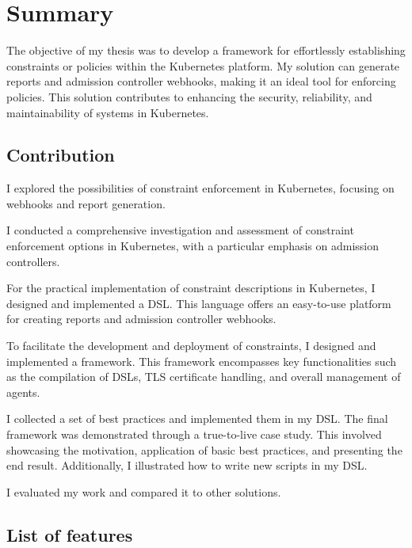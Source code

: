 \setlength{\parindent}{0pt}
\setlength{\parskip}{0.6em}

\chapter{Summary}
\label{chap:summary}

The objective of my thesis was to develop a framework for effortlessly establishing constraints or policies within the Kubernetes platform. My solution can generate reports and admission controller webhooks, making it an ideal tool for enforcing policies. This solution contributes to enhancing the security, reliability, and maintainability of systems in Kubernetes.

\section{Contribution}

I explored the possibilities of constraint enforcement in Kubernetes, focusing on webhooks and report generation.

I conducted a comprehensive investigation and assessment of constraint enforcement options in Kubernetes, with a particular emphasis on admission controllers.

For the practical implementation of constraint descriptions in Kubernetes, I designed and implemented a DSL. This language offers an easy-to-use platform for creating reports and admission controller webhooks.

To facilitate the development and deployment of constraints, I designed and implemented a framework. This framework encompasses key functionalities such as the compilation of DSLs, TLS certificate handling, and overall management of agents.

I collected a set of best practices and implemented them in my DSL.
The final framework was demonstrated through a true-to-live case study. This involved showcasing the motivation, application of basic best practices, and presenting the end result. Additionally, I illustrated how to write new scripts in my DSL.

I evaluated my work and compared it to other solutions.

\section{List of features}


